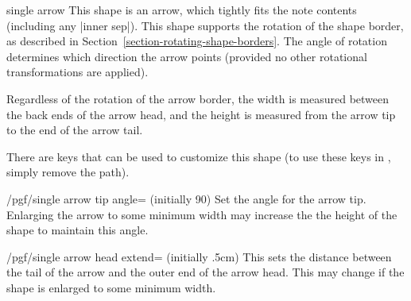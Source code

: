 \begin{shape}{single arrow}
	This shape is an arrow, which tightly fits the note contents 
	(including any |inner sep|). 
	This shape supports the rotation of the shape border, as 
	described in Section~\ref{section-rotating-shape-borders}. 
	The angle of rotation determines which direction the arrow
	points (provided no other rotational transformations are applied).
	
\begin{codeexample}[]
\end{codeexample}

	Regardless of the rotation of the arrow border, the width is 
  measured between the back ends of the arrow head, and the 
  height is measured from the arrow tip to the end of the arrow 
  tail.

\begin{codeexample}[]
\end{codeexample}

	There are \pgfname{} keys that can be used to customize this shape (to
	use these keys in \tikzname{}, simply remove the 
	path).
	
\begin{key}{/pgf/single arrow tip angle= (initially 90)}
  Set the angle for the arrow tip. Enlarging the arrow to some
  minimum width may increase the the height of the shape to maintain
  this angle.
\end{key}

\begin{key}{/pgf/single arrow head extend= (initially .5cm)}
  This sets the distance between the tail of the arrow and the outer
  end of the arrow head. This may change if the shape is enlarged to
  some minimum width.
  

\end{key}
\end{shape}
